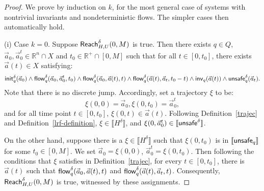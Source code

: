 \documentclass[12pt]{article}
\begin{document}
\begin{proof}
We prove by induction on $k$, for the most general case of systems with nontrivial invariants and nondeterministic flows. The simpler cases then automatically hold.

(i) Case $k=0$. Suppose $\mathsf{Reach}^{\delta}_{H,U}(0,M)$ is true. Then there exists $q\in Q$, $\vec a_0, \vec a_0^t\in \mathbb{R}^n\cap X$ and $t_0\in\mathbb{R}^+\cap[0, M]$ such that for all $t\in [0,t_0]$, there exists $\vec a(t)\in X$ satisfying:
\begin{multline*}
\mathsf{init}_{q}^{\delta}(\vec a_0)\wedge\mathsf{flow}_{q}^{\delta}(\vec a_0, \vec a_0^t, t_0)
\wedge \mathsf{flow}_q^{\delta}(\vec a_0, \vec a(t), t) \wedge \mathsf{flow}^{\delta}_q(\vec a(t), \vec a_t, t_0-t)\wedge \mathsf{inv}_q(\vec a(t)) \wedge \mathsf{unsafe}^{\delta}_q(\vec a_t).
\end{multline*}
Note that there is no discrete jump. Accordingly, set a trajectory $\xi$ to be: 
$$\xi(0,0) = \vec a_0, \xi(0,t_0) = \vec a_0^t,$$
and for all time point $t\in [0,t_0]$, $\xi(0,t)\in \vec a(t)$. Following Definition~\ref{trajec} and Definition~\ref{lrf-definition}, $\xi\in\llbracket H^{\delta}\rrbracket$, and $\xi(0, \vec a_0^t)\in\llbracket \mathsf{unsafe}^{\delta}\rrbracket$.

On the other hand, suppose there is a $\xi\in \llbracket H^{\delta}\rrbracket$ such that $\xi(0,t_0)$ is in $\llbracket\mathsf{unsafe}_q\rrbracket$ for some $t_0\in[0,M]$. We set $\vec a_0 = \xi(0,0)$, $\vec a_0^t = \xi(0,t_0)$. Then following the conditions that $\xi$ satisfies in Definition~\ref{trajec}, for every $t\in [0,t_0]$, there is $\vec a(t)$ such that $\mathsf{flow}^{\delta}_q(\vec a_0,\vec a(t),t)$ and $\mathsf{flow}^{\delta}_q (\vec a(t), \vec a_t, t)$. Consequently, $\mathsf{Reach}_{H,U}^{\delta}(0,M)$ is true, witnessed by these assignments.


\end{proof}
\end{document}
